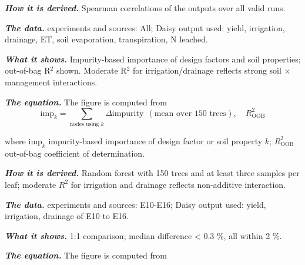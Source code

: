 \par\noindent\textbf{\color{khmag}\emph{How it is derived.}} Spearman correlations of the outputs over all valid runs.
\par\noindent\textbf{\color{khmag}\emph{The data.}} experiments and sources: All; Daisy output used: yield, irrigation, drainage, ET, soil evaporation, transpiration, N leached.
\par\vspace{6pt}\noindent{}\par\nobreak
{}\label{fig:a21_9}
\par\noindent\textbf{\color{khmag}\emph{What it shows.}} Impurity-based importance of design factors and soil properties; out-of-bag R$^2$ shown. Moderate R$^2$ for irrigation/drainage reflects strong soil $\times$ management interactions.
\par\noindent\textbf{\color{khmag}\emph{The equation.}} The figure is computed from
\begin{equation}\boxed{\mathrm{imp}_k=\sum_{\text{nodes using }k}\Delta\mathrm{impurity}\ \ (\text{mean over 150 trees}),\quad R^2_{\mathrm{OOB}}}\end{equation}
\par\noindent where $\mathrm{imp}_k$ impurity-based importance of design factor or soil property $k$; $R^2_{\mathrm{OOB}}$ out-of-bag coefficient of determination.
\par\noindent\textbf{\color{khmag}\emph{How it is derived.}} Random forest with 150 trees and at least three samples per leaf; moderate $R^2$ for irrigation and drainage reflects non-additive interaction.
\par\noindent\textbf{\color{khmag}\emph{The data.}} experiments and sources: E10-E16; Daisy output used: yield, irrigation, drainage of E10 to E16.
\par\vspace{6pt}\noindent{}\par\nobreak
{}\label{fig:a21_10}
\par\noindent\textbf{\color{khmag}\emph{What it shows.}} 1:1 comparison; median difference < 0.3 \%, all within 2 \%.
\par\noindent\textbf{\color{khmag}\emph{The equation.}} The figure is computed from
